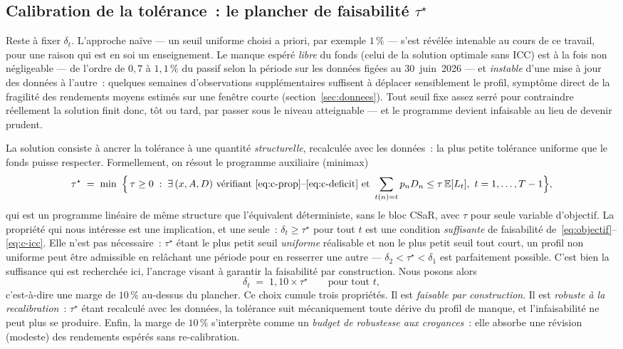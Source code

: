 \documentclass[11pt,letterpaper]{article}
\newcommand{\E}{\mathbb{E}}
\newcommand{\taustar}{\tau^{\star}}
\theoremstyle{definition}
\begin{document}
\subsection{Calibration de la tolérance~: le plancher de faisabilité $\taustar$}
\label{ssec:taustar}

Reste à fixer $\delta_t$. L'approche naïve --- un seuil uniforme choisi a priori,
par exemple $1\,\%$ --- s'est révélée intenable au cours de ce travail, pour une
raison qui est en soi un enseignement. Le manque espéré \emph{libre} du fonds
(celui de la solution optimale sans ICC) est à la fois non négligeable --- de
l'ordre de $0{,}7$ à $1{,}1\,\%$ du passif selon la période sur les données
figées au 30~juin~2026 --- et \emph{instable} d'une mise à
jour des données à l'autre~: quelques semaines d'observations supplémentaires
suffisent à déplacer sensiblement le profil, symptôme direct de la fragilité des
rendements moyens estimés sur une fenêtre courte
(section~\ref{sec:donnees}). Tout seuil fixe assez serré pour contraindre
réellement la solution finit donc, tôt ou tard, par passer sous le niveau
atteignable --- et le programme devient infaisable au lieu de devenir prudent.

La solution consiste à ancrer la tolérance à une quantité \emph{structurelle},
recalculée avec les données~: la plus petite tolérance uniforme que le fonds puisse
respecter. Formellement, on résout le programme auxiliaire (minimax)
\begin{equation}\label{eq:taustar}
\taustar \;=\; \min\ \Big\{\, \tau \ge 0 \;:\;
\exists\, (x, A, D) \text{ vérifiant \eqref{eq:c-prop}--\eqref{eq:c-deficit} et }
\sum_{t(n)=t} p_n D_n \le \tau\, \E[L_t],\ t = 1,\dots,T-1 \Big\},
\end{equation}
qui est un programme linéaire de même structure que l'équivalent déterministe,
sans le bloc CSaR, avec $\tau$ pour seule variable d'objectif. La propriété
qui nous intéresse est une implication, et une seule~: $\delta_t \ge \taustar$
pour tout $t$ est une condition \emph{suffisante} de faisabilité
de~\eqref{eq:objectif}--\eqref{eq:c-icc}. Elle n'est pas nécessaire~:
$\taustar$ étant le plus petit seuil \emph{uniforme} réalisable et non le plus
petit seuil tout court, un profil non uniforme peut être admissible en
relâchant une période pour en resserrer une autre --- $\delta_2 < \taustar <
\delta_1$ est parfaitement possible. C'est bien la suffisance qui est
recherchée ici, l'ancrage visant à garantir la faisabilité par construction.
Nous posons alors
\begin{equation}\label{eq:delta-ancrage}
\delta_t \;=\; 1{,}10 \times \taustar \qquad \text{pour tout } t,
\end{equation}
c'est-à-dire une marge de $10\,\%$ au-dessus du plancher. Ce choix cumule trois
propriétés. Il est \emph{faisable par construction}. Il est \emph{robuste à la
recalibration}~: $\taustar$ étant recalculé avec les données, la tolérance suit
mécaniquement toute dérive du profil de manque, et l'infaisabilité ne peut plus se
produire. Enfin, la marge de $10\,\%$ s'interprète comme un \emph{budget de
robustesse aux croyances}~: elle absorbe une révision (modeste) des rendements
espérés sans re-calibration.
\end{document}
